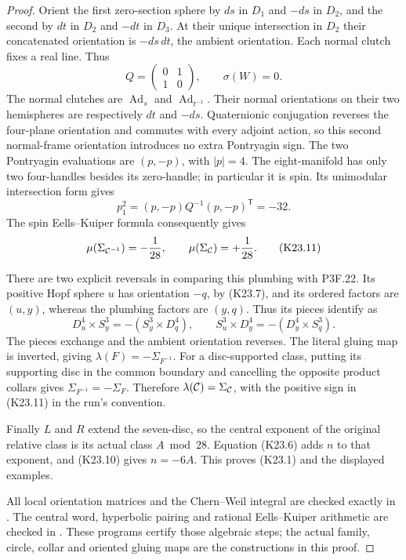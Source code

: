 \begin{proof}
Orient the first zero-section sphere by \(ds\) in \(D_1\) and
\(-ds\) in \(D_2\), and the second by \(dt\) in \(D_2\) and
\(-dt\) in \(D_3\). At their unique intersection in \(D_2\) their
concatenated orientation is \(-ds\,dt\), the ambient orientation.
Each normal clutch fixes a real line. Thus
\[
 Q=\begin{pmatrix}0&1\\1&0\end{pmatrix},\qquad \sigma(W)=0.
\]
The normal clutches are \(\operatorname{Ad}_s\) and
\(\operatorname{Ad}_{t^{-1}}\). Their normal orientations on their
two hemispheres are respectively \(dt\) and \(-ds\).
Quaternionic conjugation reverses the four-plane orientation and
commutes with every adjoint action, so this second normal-frame
orientation introduces no extra Pontryagin sign. The two
Pontryagin evaluations are \((p,-p)\), with \(|p|=4\).
The eight-manifold has only two four-handles besides its zero-handle;
in particular it is spin. Its unimodular intersection form gives
\[
 p_1^2=(p,-p)Q^{-1}(p,-p)^{\mathsf T}=-32.
\]
The spin Eells--Kuiper formula consequently gives
\[
 \mu(\Sigma_{{\cal C}^{-1}})=-\frac1{28},\qquad
 \mu(\Sigma_{\cal C})=+\frac1{28}.                   \tag{K23.11}
\]

There are two explicit reversals in comparing this plumbing with
P3F.22. Its positive Hopf sphere \(u\) has orientation \(-q\),
by (K23.7), and its ordered factors are \((u,y)\), whereas the
plumbing factors are \((y,q)\). Thus its pieces identify as
\[
 D^4_u\times S^3_y=-(S^3_y\times D^4_q),\qquad
 S^3_u\times D^4_y=-(D^4_y\times S^3_q).
\]
The pieces exchange and the ambient orientation reverses. The
literal gluing map is inverted, giving
\(\lambda(F)=-\Sigma_{F^{-1}}\). For a disc-supported class,
putting its supporting disc in the common boundary and cancelling
the opposite product collars gives
\(\Sigma_{F^{-1}}=-\Sigma_F\). Therefore
\(\lambda({\cal C})=\Sigma_{\cal C}\), with the positive sign
in (K23.11) in the run's convention.

Finally \(L\) and \(R\) extend the seven-disc, so the central exponent
of the original relative class is its actual class \(A\bmod28\).
Equation (K23.6) adds \(n\) to that exponent, and (K23.10) gives
\(n=-6A\). This proves (K23.1) and the displayed examples.

All local orientation matrices and the Chern--Weil integral are
checked exactly in . The
central word, hyperbolic pairing and rational Eells--Kuiper
arithmetic are checked in .
These programs certify those algebraic steps; the actual family,
circle, collar and oriented gluing maps are the constructions in
this proof.
\end{proof}
